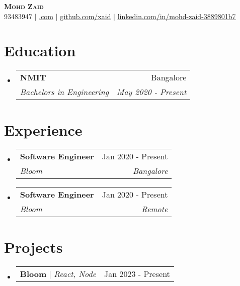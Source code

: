 \documentclass[letterpaper,11pt]{article}
\makeatletter
\newcommand{\resumeSubheading}[4]{
  \vspace{-2pt}\item
    \begin{tabular*}{0.97\textwidth}[t]{l@{\extracolsep{\fill}}r}
      \textbf{#1} & #2 \\
      \textit{\small#3} & \textit{\small #4} \\
    \end{tabular*}\vspace{-7pt}
}
\newcommand{\resumeProjectHeading}[2]{
    \item
    \begin{tabular*}{0.97\textwidth}{l@{\extracolsep{\fill}}r}
      \small#1 & #2 \\
    \end{tabular*}\vspace{-7pt}
}
\newcommand{\resumeSubHeadingListStart}{\begin{itemize}[leftmargin=0.15in, label={}]}
\newcommand{\resumeSubHeadingListEnd}{\end{itemize}}
\makeatother
\begin{document}
\begin{center}
    \textbf{\Huge \scshape Mohd Zaid} \\ \vspace{1pt}
    \small 
    93483947
     $|$ 
    \href{mailto:zaid@gmail.com}{\underlinezaid@gmail.com}
     $|$ 
    \href{https://github.com/xaid}{\underline{github.com/xaid}}
     $|$ 
    \href{https://linkedin.com/in/mohd-zaid-3889801b7}{\underline{linkedin.com/in/mohd-zaid-3889801b7}}
\end{center}

\section{Education}
    \resumeSubHeadingListStart
        \resumeSubheading
            { NMIT }{ Bangalore }
            { Bachelors in Engineering }{ May 2020 - Present }
    \resumeSubHeadingListEnd

\section{Experience}
    \resumeSubHeadingListStart
        \resumeSubheading
            { Software Engineer }{ Jan 2020 - Present }
            { Bloom }{ Bangalore }
        \resumeSubheading
            { Software Engineer }{ Jan 2020 - Present }
            { Bloom }{ Remote }
    \resumeSubHeadingListEnd

\section{Projects}
    \resumeSubHeadingListStart
        \resumeProjectHeading
            {\textbf{ Bloom } $|$ \emph{ React, Node }}{ Jan 2023 - Present }
    \resumeSubHeadingListEnd
\end{document}
